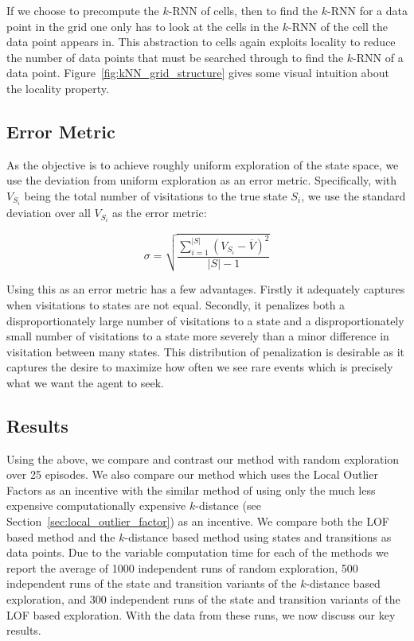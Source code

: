 \documentclass[../main.tex]{subfiles}
\begin{document}
If we choose to precompute the $k$-RNN of cells, then to find the $k$-RNN for a data point in the grid one only has to look at the cells in the $k$-RNN of the cell the data point appears in. This abstraction to cells again exploits locality to reduce the number of data points that must be searched through to find the $k$-RNN of a data point. Figure~\ref{fig:kNN_grid_structure} gives some visual intuition about the locality property.

\subsection{Error Metric}
\label{sec:error_metric}

As the objective is to achieve roughly uniform exploration of the state space, we use the deviation from uniform exploration as an error metric. Specifically, with $V_{S_i}$ being the total number of visitations to the true state $S_i$, we use the standard deviation over all $V_{S_i}$ as the error metric:

\begin{equation}
    \label{eqn:error}
    \sigma = \sqrt{\frac{\sum_{i = 1}^{|S|} \left(V_{S_i} - \overline{V}\right)^2}{|S| - 1}}
\end{equation}

Using this as an error metric has a few advantages. Firstly it adequately captures when visitations to states are not equal. Secondly, it penalizes both a disproportionately large number of visitations to a state and a disproportionately small number of visitations to a state more severely than a minor difference in visitation between many states. This distribution of penalization is desirable as it captures the desire to maximize how often we see rare events which is precisely what we want the agent to seek.

\subsection{Results}
\label{sec:results}

Using the above, we compare and contrast our method with random exploration over 25 episodes. We also compare our method which uses the Local Outlier Factors as an incentive with the similar method of using only the much less expensive computationally expensive $k$-distance (see Section~\ref{sec:local_outlier_factor}) as an incentive. We compare both the LOF based method and the $k$-distance based method using states and transitions as data points. Due to the variable computation time for each of the methods we report the average of 1000 independent runs of random exploration, 500 independent runs of the state and transition variants of the $k$-distance based exploration, and 300 independent runs of the state and transition variants of the LOF based exploration. With the data from these runs, we now discuss our key results.
\end{document}
